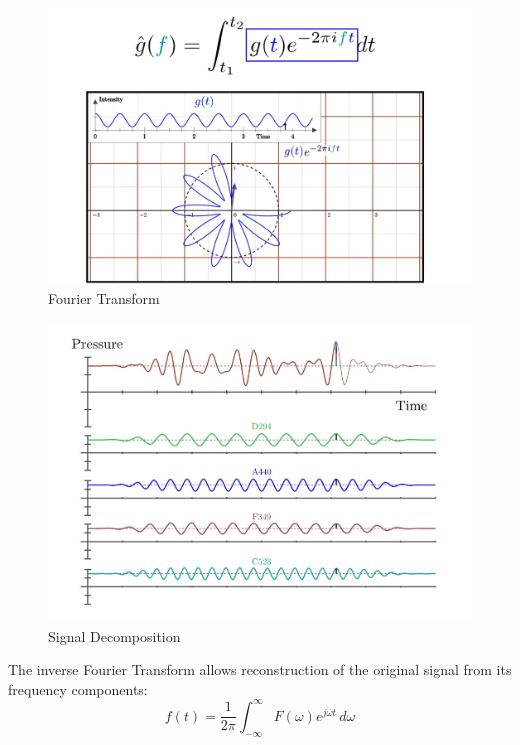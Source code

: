\documentclass{article}
\begin{document}
\begin{figure}[!ht]
    \centering
    \includegraphics[width=\textwidth]{./pics/convolv.png}
    \caption{Fourier Transform}
    \label{fig:fourier_transform}
\end{figure}

\begin{figure}[!ht]
    \centering
    \includegraphics[width=\textwidth]{./pics/decomp.png}
    \caption{Signal Decomposition}
    \label{fig:signal_decomp}
\end{figure}


The inverse Fourier Transform allows reconstruction of the original signal from its frequency components:
\[
    f(t) = \frac{1}{2\pi} \int_{-\infty}^{\infty} F(\omega) e^{j\omega t} \, d\omega
\]
\end{document}
